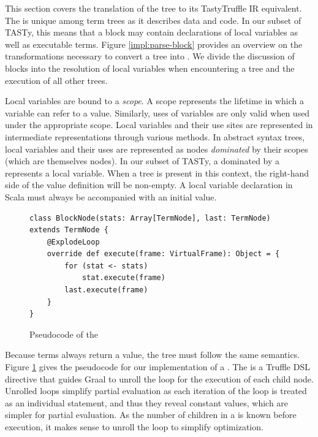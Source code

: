 This section covers the translation of the  tree to its TastyTruffle IR equivalent.
The  is unique among term trees as it describes data and code.
In our subset of TASTy, this means that a block may contain declarations of local variables as well as executable terms.
Figure \ref{impl:parse-block} provides an overview on the transformations necessary to convert a  tree into .
We divide the discussion of blocks into the resolution of local variables when encountering a  tree and the execution of all other trees.

Local variables are bound to a \textit{scope}. 
A scope represents the lifetime in which a variable can refer to a value. 
Similarly, uses of variables are only valid when used under the appropriate scope. 
Local variables and their use sites are represented in intermediate representations through various methods. 
In abstract syntax trees, local variables and their uses are represented as nodes \textit{dominated} by their scopes (which are themselves nodes). 
In our subset of TASTy, a  dominated by a  represents a local variable.
When a  tree is present in this context, the right-hand side of the value definition will be non-empty.
A local variable declaration in Scala must always be accompanied with an initial value.

\begin{figure}[!htb]
\begin{verbatim}
class BlockNode(stats: Array[TermNode], last: TermNode) extends TermNode {
	@ExplodeLoop
	override def execute(frame: VirtualFrame): Object = {
		for (stat <- stats) 
			stat.execute(frame)
		last.execute(frame)
	}
}
\end{verbatim}
\caption{Pseudocode of the }
\label{impl:block-node}
\end{figure}

Because terms always return a value, the  tree must follow the same semantics.
Figure \ref{impl:block-node} gives the pseudocode for our implementation of a .
The  is a Truffle DSL directive that guides Graal to unroll\cite{loop-unrolling} the loop for the execution of each child node.
Unrolled loops simplify partial evaluation as each iteration of the loop is treated as an individual statement, and thus they reveal constant values, which are simpler for partial evaluation.
As the number of children in a  is known before execution, it makes sense to unroll the loop to simplify optimization.
\newpage
